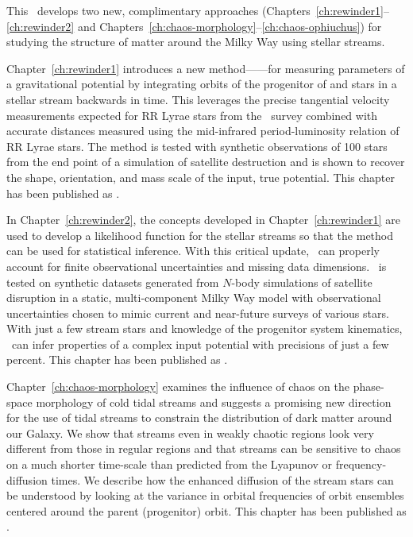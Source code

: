 This \article\ develops two new, complimentary approaches
(Chapters~\ref{ch:rewinder1}--\ref{ch:rewinder2} and
Chapters~\ref{ch:chaos-morphology}--\ref{ch:chaos-ophiuchus}) for studying the
structure of matter around the Milky Way using stellar streams.

Chapter~\ref{ch:rewinder1} introduces a new method---\rewinder---for measuring
parameters of a gravitational potential by integrating orbits of the progenitor
of and stars in a stellar stream backwards in time. This leverages the precise
tangential velocity measurements expected for RR Lyrae stars from the \gaia\
survey combined with accurate distances measured using the mid-infrared
period-luminosity relation of RR Lyrae stars. The method is tested with
synthetic observations of 100 stars from the end point of a simulation of
satellite destruction and is shown to recover the shape, orientation, and mass
scale of the input, true potential. This chapter has been published as
\citep{apw13}.

In Chapter~\ref{ch:rewinder2}, the concepts developed in
Chapter~\ref{ch:rewinder1} are used to develop a likelihood function for the
stellar streams so that the method can be used for statistical inference. With
this critical update, \rewinder\ can properly account for finite observational
uncertainties and missing data dimensions. \rewinder\ is tested on synthetic
datasets generated from $N$-body simulations of satellite disruption in a
static, multi-component Milky Way model with observational uncertainties chosen
to mimic current and near-future surveys of various stars. With just a few
stream stars and knowledge of the progenitor system kinematics, \rewinder\ can
infer properties of a complex input potential with precisions of just a few
percent. This chapter has been published as \citep{apw14}.

Chapter~\ref{ch:chaos-morphology} examines the influence of chaos on the
phase-space morphology of cold tidal streams and suggests a promising new
direction for the use of tidal streams to constrain the distribution of dark
matter around our Galaxy. We show that streams even in weakly chaotic regions
look very different from those in regular regions and that streams can be
sensitive to chaos on a much shorter time-scale than predicted from the Lyapunov
or frequency-diffusion times. We describe how the enhanced diffusion of the
stream stars can be understood by looking at the variance in orbital frequencies
of orbit ensembles centered around the parent (progenitor) orbit. This chapter
has been published as \citep{apw15-chaos}.

